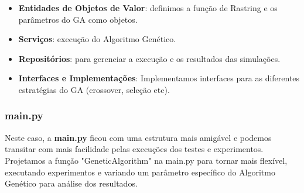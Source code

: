 \documentclass[a4paper, 12pt]{article}
\begin{document}
\begin{itemize}
    \item \textbf{Entidades de Objetos de Valor}: definimos a função de Rastring e os parâmetros do GA como objetos.
    \item \textbf{Serviços}: execução do Algoritmo Genético.
    \item \textbf{Repositórios}: para gerenciar a execução e os resultados das simulações.
    \item \textbf{Interfaces e Implementações}: Implementamos interfaces para as diferentes estratégias do GA (crossover, seleção etc).
\end{itemize}

\subsubsection{main.py}
Neste caso, a \textbf{main.py} ficou com uma estrutura mais amigável e podemos transitar com mais facilidade pelas execuções dos testes e experimentos.\\

Projetamos a função "GeneticAlgorithm" na main.py para tornar mais flexível, executando experimentos e variando um parâmetro específico do Algoritmo Genético para análise dos resultados.\\
\end{document}
